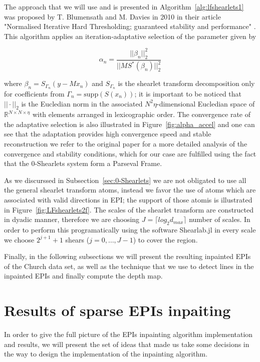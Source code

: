 The approach that we will use and is presented in Algorithm~\ref{alg:lfshearlets1} was proposed by T. Blumensath and M. Davies in 2010 in their article "Normalised Iterative Hard Thresholding; guaranteed stability and performance" \cite{hard-thresholding}. This algorithm applies an iteration-adaptative selection of the parameter given by

$$
\alpha_n=\frac{||\beta_n||_2^2}{||MS^*(\beta_n)||_2^2}
$$

where $\beta_n=S_{\Gamma_n}(y-Mx_n)$ and $S_{\Gamma_n}$ is the shearlet transform decomposition only for coefficients from $\Gamma_n=\textrm{supp}(S(x_n))$; it is important to be noticed that $||\cdot||_2$ is the Eucledian norm in the associated $N^2\eta$-dimensional Eucledian space of $\mathbb{R}^{N\times N\times \eta}$ with elements arranged in lexicographic order. The convergence rate of the adaptative selection is also illustrated in Figure~\ref{fig:alpha_accel} and one can see that the adaptation provides high convergence speed and stable reconstruction we refer to the original paper \cite{hard-thresholding} for a more detailed analysis of the convergence and stability conditions, which for our case are fulfilled using the fact that the $0$-Shearlets system form a Parseval Frame. 

\bigskip

As we discurssed in Subsection~\ref{sec:0-Shearlets} we are not obligated to use all the general shearlet transform atoms, instead we favor the use of atoms which are associated with valid directions in EPI; the support of those atomis is illustrated in Figure~\ref{fig:LFshearlets2f}. The scales of the shearlet transform are constructed in dyadic manner, therefore we are choosing $J = \lceil log_2 d_{max}\rceil$ number of scales. In order to perform this programatically using the software Shearlab.jl in every scale we choose $2^{j+1}+1$ shears ($j=0,\ldots, J-1$) to cover the region.

\bigskip

Finally, in the following subsections we will present the resulting inpainted EPIs of the Church data set, as well as the technique that we use to detect lines in the inpainted EPIs and finally compute the depth map. 

\section{Results of sparse EPIs inpaiting}

In order to give the full picture of the EPIs inpainting algorithm implementation and results, we will present the set of ideas that made us take some decisions in the way to design the implementation of the inpainting algorithm.

